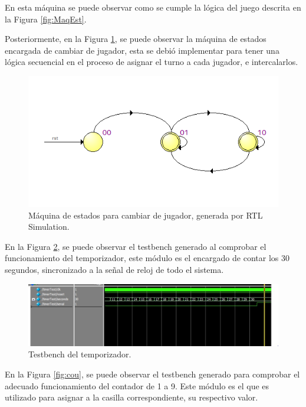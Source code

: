 \documentclass[journal,trans]{IEEEtran}
\begin{document}
	En esta máquina se puede observar como se cumple la lógica del juego descrita en la Figura \ref{fig:MaqEst}.
	
	Posteriormente, en la Figura \ref{fig:MaqE1}, se puede observar la máquina de estados encargada de cambiar de jugador, esta se debió implementar para tener una lógica secuencial en el proceso de asignar el turno a cada jugador, e intercalarlos.
	
	\begin{figure}[hbtp]
		\centering
		\includegraphics[width = \columnwidth]{imagenes/MaqE1.png}
		\caption[Figura1]{Máquina de estados para cambiar de jugador, generada por RTL Simulation.}
		\label{fig:MaqE1}
	\end{figure}
	
	En la Figura \ref{fig:timer}, se puede observar el testbench generado al comprobar el funcionamiento del temporizador, este módulo es el encargado de contar los 30 segundos, sincronizado a la señal de reloj de todo el sistema.
	
	\begin{figure}[hbtp]
		\centering
		\includegraphics[width = \columnwidth]{imagenes/timer.jpeg}
		\caption[Figura1]{Testbench del temporizador.}
		\label{fig:timer}
	\end{figure}
	
	
	En la Figura \ref{fig:cou}, se puede observar el testbench generado para comprobar el adecuado funcionamiento del contador de 1 a 9. Este módulo es el que es utilizado para asignar a la casilla correspondiente, su respectivo valor.
	
\end{document}
